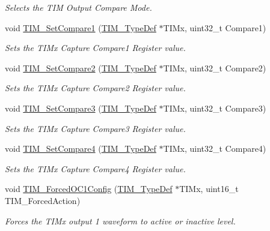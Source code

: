 \begin{DoxyCompactItemize}
\begin{DoxyCompactList}\small\item\em Selects the T\+IM Output Compare Mode. \end{DoxyCompactList}\item 
void \hyperlink{group___t_i_m_ga48631e66c32bb905946664f4722b2546}{T\+I\+M\+\_\+\+Set\+Compare1} (\hyperlink{struct_t_i_m___type_def}{T\+I\+M\+\_\+\+Type\+Def} $\ast$T\+I\+Mx, uint32\+\_\+t Compare1)
\begin{DoxyCompactList}\small\item\em Sets the T\+I\+Mx Capture Compare1 Register value. \end{DoxyCompactList}\item 
void \hyperlink{group___t_i_m_ga3de36754f3ba5d46b9ef2bf8e77575c7}{T\+I\+M\+\_\+\+Set\+Compare2} (\hyperlink{struct_t_i_m___type_def}{T\+I\+M\+\_\+\+Type\+Def} $\ast$T\+I\+Mx, uint32\+\_\+t Compare2)
\begin{DoxyCompactList}\small\item\em Sets the T\+I\+Mx Capture Compare2 Register value. \end{DoxyCompactList}\item 
void \hyperlink{group___t_i_m_gac372fbbbbc20329802659dd6c6b4e051}{T\+I\+M\+\_\+\+Set\+Compare3} (\hyperlink{struct_t_i_m___type_def}{T\+I\+M\+\_\+\+Type\+Def} $\ast$T\+I\+Mx, uint32\+\_\+t Compare3)
\begin{DoxyCompactList}\small\item\em Sets the T\+I\+Mx Capture Compare3 Register value. \end{DoxyCompactList}\item 
void \hyperlink{group___t_i_m_ga99ba6c2afa87a239c9d32a49762b4245}{T\+I\+M\+\_\+\+Set\+Compare4} (\hyperlink{struct_t_i_m___type_def}{T\+I\+M\+\_\+\+Type\+Def} $\ast$T\+I\+Mx, uint32\+\_\+t Compare4)
\begin{DoxyCompactList}\small\item\em Sets the T\+I\+Mx Capture Compare4 Register value. \end{DoxyCompactList}\item 
void \hyperlink{group___t_i_m_ga4f58c12e6493a0d8b9555c9097b831d6}{T\+I\+M\+\_\+\+Forced\+O\+C1\+Config} (\hyperlink{struct_t_i_m___type_def}{T\+I\+M\+\_\+\+Type\+Def} $\ast$T\+I\+Mx, uint16\+\_\+t T\+I\+M\+\_\+\+Forced\+Action)
\begin{DoxyCompactList}\small\item\em Forces the T\+I\+Mx output 1 waveform to active or inactive level. \end{DoxyCompactList}\item 

\end{DoxyCompactItemize}
